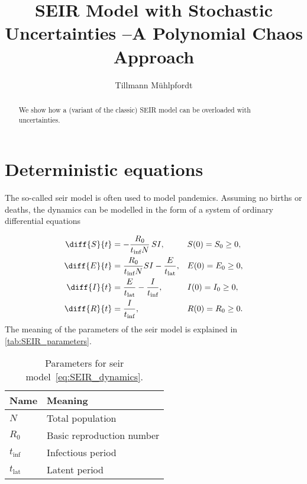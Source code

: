 \documentclass{article}
\title{SEIR Model with Stochastic Uncertainties --\newline A Polynomial Chaos Approach}
\author{Tillmann Mühlpfordt}
\newcommand{\susceptible}{S}
\newcommand{\exposed}{E}
\newcommand{\infected}{I}
\newcommand{\recovered}{R}
\newcommand{\reproduction}{R_0}
\newcommand{\populuation}{N}
\newcommand{\tlatent}{t_{\text{lat}}}
\newcommand{\tinfect}{t_{\text{inf}}}
\begin{document}
\maketitle

\begin{abstract}
We show how a (variant of the classic) SEIR model can be overloaded with uncertainties.
\end{abstract}

\section{Deterministic equations}

The so-called \gls{seir} model is often used to model pandemics.
Assuming no births or deaths, the dynamics can be modelled in the form of a system of ordinary differential equations \cite{DGEpi2020_03_23, RKI2020_03_20}

\begin{subequations}
\label{eq:SEIR_dynamics}
\begin{align}
    \diff{\susceptible}{t} &= - \frac{\reproduction}{\tinfect \populuation} \, \susceptible \infected, && \susceptible(0) = \susceptible_0 \geq 0, \\
    \diff{\exposed}{t} &= \frac{\reproduction}{\tinfect \populuation} \susceptible \infected - \frac{\exposed}{\tlatent}, && \exposed(0) = \exposed_0 \geq 0, \\
    \diff{\infected}{t} &= \frac{\exposed}{\tlatent} - \frac{\infected}{\tinfect}, && \infected(0) = \infected_0 \geq 0, \\
    \diff{\recovered}{t} &= \frac{\infected}{\tinfect}, && \recovered(0) = \recovered_0 \geq 0. 
\end{align}
\end{subequations}
The meaning of the parameters of the \gls{seir} model is explained in \autoref{tab:SEIR_parameters}.

\begin{table}[h!]
    \centering
    \caption{Parameters for \gls{seir} model~\eqref{eq:SEIR_dynamics}.\label{tab:SEIR_parameters}}
    \begin{tabular}{ll}
        \toprule
        Name & Meaning \\
        \midrule
        $\populuation$ & Total population \\
        $\reproduction$ & Basic reproduction number \\
        $\tinfect$ & Infectious period \\
        $\tlatent$ & Latent period \\
        \bottomrule
    \end{tabular}
\end{table}
\end{document}
